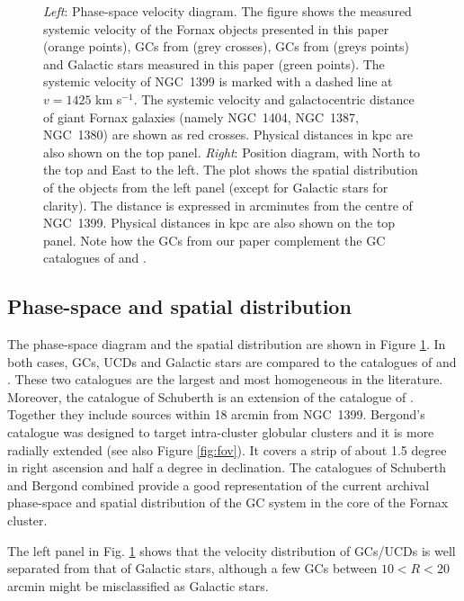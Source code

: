 \documentclass[useAMS,usenatbib]{mn2e}
\begin{document}
\begin{figure}
\caption{\textit{Left}: Phase-space velocity diagram. The figure shows the 
measured systemic velocity of the Fornax objects presented in this paper 
(orange points), GCs from \citet{Schuberth} (grey crosses), GCs from 
\citet{Bergond07} (greys points) and Galactic stars measured in this paper 
(green points). The systemic velocity of NGC~1399 is marked with a dashed line 
at $v = 1425$ km s$^{-1}$. The systemic velocity and galactocentric distance of 
giant Fornax galaxies (namely NGC~1404, NGC~1387, NGC~1380) are shown as red 
crosses. Physical distances in kpc are also shown on the top panel. 
\textit{Right}: Position diagram, with North to the top and East to the left. 
The plot shows the spatial distribution of the objects from the left panel 
(except for Galactic stars for clarity). The distance is expressed in 
arcminutes from the centre of NGC~1399. Physical distances in kpc are also 
shown on the top panel.  Note how the GCs from our paper complement the GC 
catalogues of \citet{Schuberth} and \citet{Bergond07}. }
\label{fig:phase-space}
\end{figure}

\subsection{Phase-space and spatial distribution}

The phase-space diagram and the spatial distribution are shown in Figure 
\ref{fig:phase-space}. In both cases, GCs, UCDs and Galactic stars are compared 
to the catalogues of \citet{Bergond07} and \citet{Schuberth}. These two 
catalogues are the largest and most homogeneous in the literature. Moreover, 
the catalogue of Schuberth is an extension of the catalogue of 
\citet{Dirsch04}. Together they include sources within 18 arcmin from NGC~1399. 
Bergond's catalogue was designed to target intra-cluster globular clusters and 
it is more radially extended (see also Figure \ref{fig:fov}). It covers a strip 
of about 1.5 degree in right ascension and half a degree in declination. The 
catalogues of Schuberth and Bergond combined provide a good representation of 
the current archival phase-space and spatial distribution of the GC system in 
the core of the Fornax cluster. 

The left panel in Fig. \ref{fig:phase-space} shows that the velocity 
distribution of GCs/UCDs is well separated from that of Galactic stars, 
although a few GCs between $10<R<20$ arcmin might be misclassified as Galactic 
stars. 
\end{document}
